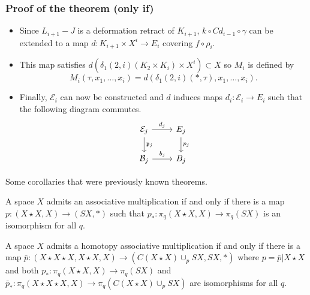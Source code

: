 \documentclass{beamer}
\theoremstyle{definition}
\begin{document}
\begin{frame}[fragile]
\frametitle{Proof of the theorem (only if)}
\begin{itemize}
 \item<1-> Since $L_{i+1}-J$ is a deformation retract of $K_{i+1}$, $ k\circ Cd_{i-1}\circ\gamma$ can be extended to a map $d:K_{i+1}\times X^i\to E_i$ covering $f\circ\rho_i$. %
 \item<2-> This map satisfies $d(\delta_1(2,i)(K_2\times K_i)\times X^i)\subset X$ so $M_i$ is defined by \[M_i(\tau,x_1,\dots,x_i)=d(\delta_1(2,i)(*,\tau),x_1,\dots, x_i).\]
 \item<3-> Finally, $\mathcal{E}_i$ can now be constructed and $d$ induces maps $d_i:\mathcal{E}_i\to E_i$ such that the following diagram commutes.
 \[
\begin{tikzcd}
\mathcal{E}_j\arrow[r,"d_j"]\arrow[d,"\mathfrak{p}_j"]& E_j\arrow[d,"p_j"]\\
\mathcal{B}_j\arrow[r,"b_j"]&B_j
\end{tikzcd}
\]
\end{itemize}
\end{frame}

\begin{frame}
Some corollaries that were previously known theorems.\pause
\begin{corollary}
A space $X$ admits an associative multiplication if and only if there is a map $p:(X\star X, X)\to (SX,*)$ such that $p_*:\pi_q(X\star X, X)\to \pi_q(SX)$ is an isomorphism for all $q$. %
\end{corollary}\pause
\begin{corollary}
A space $X$ admits a homotopy associative multiplication if and only if there is a map $\bar{p}:(X\star X\star X,X\star X,X)\to (C(X\star X)\cup_p SX, SX,*)$ where $p=\bar{p}|X\star X$ and both $p_*:\pi_q(X\star X, X)\to \pi_q(SX)$ and $\bar{p}_*:\pi_q(X\star X\star X, X)\to \pi_q(C(X\star X)\cup_p SX)$ are isomorphisms for all $q$.
\end{corollary}
\end{frame}
\end{document}
